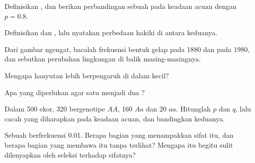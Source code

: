 \begin{exercise}[$\star$]\label{exo:g12:selection-drift-speciation:1}
Definisikan , dan berikan perbandingan  sebuah
 pada keadaan acuan dengan $p = 0.8$.
\end{exercise}

\begin{exercise}[$\star$]\label{exo:g12:selection-drift-speciation:2}
Definisikan  dan , lalu nyatakan perbedaan
hakiki di antara keduanya.
\end{exercise}

\begin{exercise}[$\star$]\label{exo:g12:selection-drift-speciation:3}
Dari gambar ngengat, bacalah frekuensi bentuk gelap pada 1880 dan pada
1980, dan sebutkan perubahan lingkungan di balik masing-masingnya.
\end{exercise}

\begin{exercise}[$\star$]\label{exo:g12:selection-drift-speciation:4}
Mengapa hanyutan lebih berpengaruh di dalam  kecil?
\end{exercise}

\begin{exercise}[$\star$]\label{exo:g12:selection-drift-speciation:5}
Apa yang diperlukan agar satu  menjadi dua ?
\end{exercise}

\begin{exercise}[$\star\star$]\label{exo:g12:selection-drift-speciation:6}
Dalam  500 ekor, 320 bergenotipe $AA$, 160 $Aa$ dan 20 $aa$. Hitunglah
$p$ dan $q$, lalu cacah  yang diharapkan pada keadaan acuan,
dan bandingkan keduanya.
\end{exercise}

\begin{exercise}[$\star\star$]\label{exo:g12:selection-drift-speciation:7}
Sebuah   berfrekuensi 0.01. Berapa bagian  yang
menampakkan sifat  itu, dan berapa bagian yang membawa  itu
tanpa terlihat? Mengapa  itu begitu sulit dilenyapkan oleh seleksi
terhadap sifatnya?
\end{exercise}

